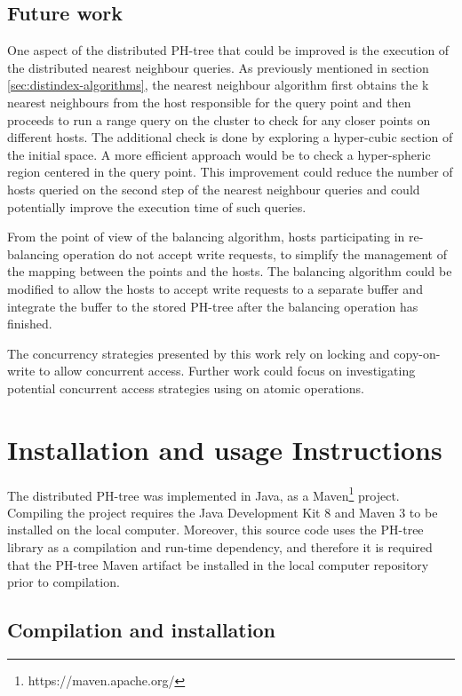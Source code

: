 \documentclass[11pt,a4paper]{globis-book}
\begin{document}
\section{Future work}
\label{sec:conclusions-future-work}

One aspect of the distributed PH-tree that could be improved is the execution of the distributed nearest neighbour queries. As previously mentioned in section \ref{sec:distindex-algorithms}, the nearest neighbour algorithm first obtains the k nearest neighbours from the host responsible for the query point and then proceeds to run a range query on the cluster to check for any closer points on different hosts. The additional check is done by exploring a hyper-cubic section of the initial space. A more efficient approach would be to check a hyper-spheric region centered in the query point. This improvement could reduce the number of hosts queried on the second step of the nearest neighbour queries and could potentially improve the execution time of such queries. 

From the point of view of the balancing algorithm, hosts participating in re-balancing operation do not accept write requests, to simplify the management of the mapping between the points and the hosts. The balancing algorithm could be modified to allow the hosts to accept write requests to a separate buffer and integrate the buffer to the stored PH-tree after the balancing operation has finished.

The concurrency strategies presented by this work rely on locking and copy-on-write to allow concurrent access. Further work could focus on investigating potential concurrent access strategies using on atomic operations.

\appendix
\chapter{Installation and usage Instructions}

The distributed PH-tree was implemented in Java, as a Maven\footnote{https://maven.apache.org/} project. Compiling the project requires the Java Development Kit 8 and Maven 3 to be installed on the local computer. Moreover, this source code uses the PH-tree library as a compilation and run-time dependency, and therefore it is required that the PH-tree Maven artifact be installed in the local computer repository prior to compilation. 

\section{Compilation and installation} 
\end{document}
